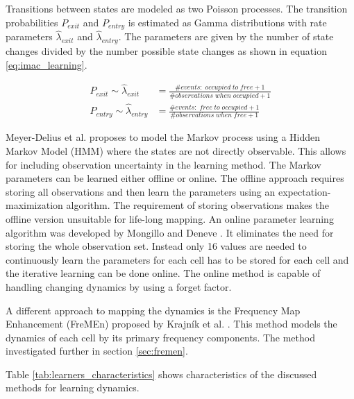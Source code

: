 Transitions between states are modeled as two Poisson processes. The transition probabilities $P_{exit}$ and $P_{entry}$ is estimated as Gamma distributions with rate parameters $\hat{\lambda}_{exit}$ and $\hat{\lambda}_{entry}$.
The parameters are given by the number of state changes divided by the number possible state changes as shown in equation \ref{eq:imac_learning}.

\begin{align}
	P_{exit} \sim \hat{\lambda}_{exit} &= \frac{\#events:\; occupied\; to\; free + 1}{\#observations\; when\; occupied + 1} \label{eq:imac_learning}\\
	P_{entry} \sim\hat{\lambda}_{entry} &= \frac{\#events:\; free\; to\; occupied + 1}{\#observations\; when\; free + 1}
	\nonumber
\end{align}


Meyer-Delius et al. \cite{Meyer-Delius2012} proposes to model the Markov process using a Hidden Markov Model (HMM) where the states are not directly observable.
This allows for  including observation uncertainty in the learning method.
The Markov parameters can be learned either offline or online.
The offline approach requires storing all observations and then learn the parameters using an expectation-maximization algorithm. 
The requirement of storing observations makes the offline version unsuitable for life-long mapping. 
An online parameter learning algorithm was developed by Mongillo and Deneve \cite{Mongillo2008}. 
It eliminates the need for storing the whole observation set. 
Instead only 16 values are needed to continuously learn the parameters for each cell 
has to be stored for each cell and the iterative learning can be done online. 
The online method is capable of handling changing dynamics by using a forget factor. 

A different approach to mapping the dynamics is the Frequency Map Enhancement (FreMEn) proposed by Krajník et al. \cite{Krajnik2014}. This method models the dynamics of each cell by its primary frequency components.
The method investigated further in section \ref{sec:fremen}.

Table \ref{tab:learners_characteristics} shows characteristics of the discussed methods for learning dynamics. 

